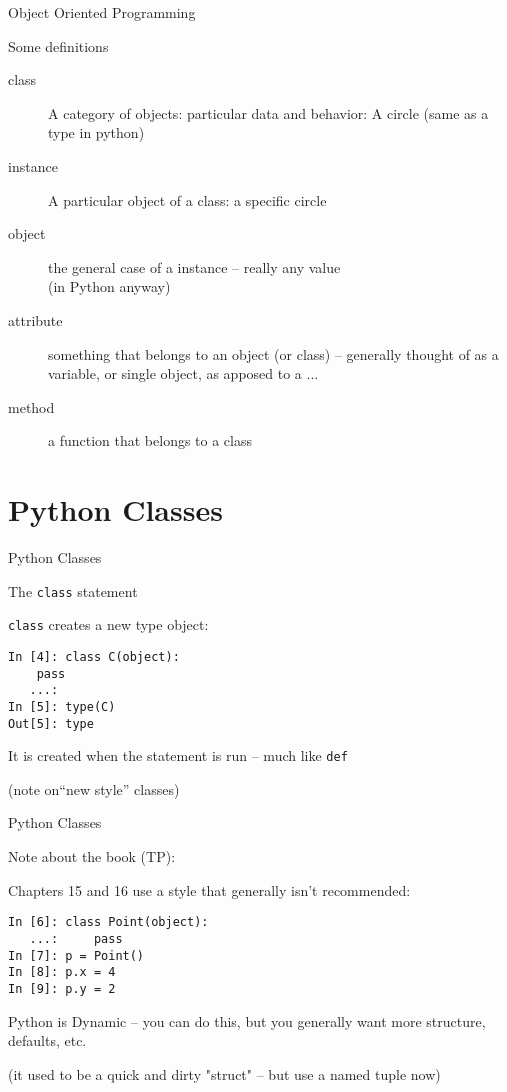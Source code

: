 \documentclass{beamer}
\begin{document}
\begin{frame}[fragile]{Object Oriented Programming}

\vfill
{\LARGE Some definitions}

\begin{description}
  \item[class] A category of objects: particular data and behavior: A circle (same as a type in python)
  \item[instance] A particular object of a class: a specific circle
  \item[object] the general case of a instance -- really any value\\ (in Python anyway)
  \item[attribute] something that belongs to an object (or class)
    -- generally thought of as a variable, or single object, as apposed to a ...
  \item[method] a function that belongs to a class
\end{description}

\end{frame} 


\section{Python Classes}

\begin{frame}[fragile]{Python Classes}

{\Large The \verb|class| statement}

\vfill
{\large \verb|class| creates a new type object:}

\begin{verbatim}
In [4]: class C(object):
    pass
   ...: 
In [5]: type(C)
Out[5]: type
\end{verbatim}

{\large It is created when the statement is run -- much like \verb|def|}

\vfill
(note on``new style'' classes)

\end{frame} 

\begin{frame}[fragile]{Python Classes}

{\Large Note about the book (TP):}

Chapters 15 and 16 use a style that generally isn't recommended:

\begin{verbatim}
In [6]: class Point(object):
   ...:     pass
In [7]: p = Point()
In [8]: p.x = 4
In [9]: p.y = 2
\end{verbatim}

Python is Dynamic -- you can do this, but you generally want more structure,
defaults, etc. 

\vfill
(it used to be a quick and dirty "struct" -- but use a named tuple now)
\end{frame} 
\end{document}
